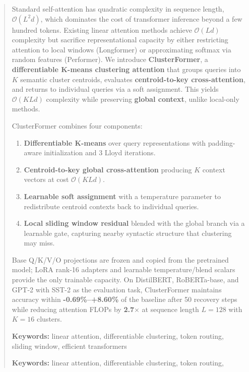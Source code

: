 \documentclass{article}
\begin{document}
\maketitle

\begin{abstract}
Standard self-attention has quadratic complexity in sequence length, 
$\mathcal{O}(L^2 d)$, which dominates the cost of transformer inference 
beyond a few hundred tokens. Existing linear attention methods achieve 
$\mathcal{O}(L d)$ complexity but sacrifice representational capacity by 
either restricting attention to local windows (Longformer) or approximating 
softmax via random features (Performer). We introduce \textbf{ClusterFormer}, a 
\textbf{differentiable K-means clustering attention} that groups queries into 
$K$ semantic cluster centroids, evaluates \textbf{centroid-to-key cross-attention}, 
and returns to individual queries via a soft assignment. This yields 
$\mathcal{O}(K L d)$ complexity while preserving \textbf{global context}, 
unlike local-only methods.

ClusterFormer combines four components:

\begin{enumerate}
\item \textbf{Differentiable K-means} over query representations with padding-aware
  initialization and 3 Lloyd iterations.
\item \textbf{Centroid-to-key global cross-attention} producing $K$ context vectors
  at cost $\mathcal{O}(K L d)$.
\item \textbf{Learnable soft assignment} with a temperature parameter to redistribute
  centroid contexts back to individual queries.
\item \textbf{Local sliding window residual} blended with the global branch via a
  learnable gate, capturing nearby syntactic structure that clustering may
  miss.

\end{enumerate}
Base Q/K/V/O projections are frozen and copied from the pretrained model; 
LoRA rank-16 adapters and learnable temperature/blend scalars provide the 
only trainable capacity. On DistilBERT, RoBERTa-base, and GPT-2 with SST-2 
as the evaluation task, ClusterFormer maintains accuracy within 
\textbf{-0.69\%--+8.60\%} of the baseline after 50 
recovery steps while reducing attention FLOPs by \textbf{2.7$\times$} at 
sequence length $L = 128$ with $K = 16$ clusters.

\textbf{Keywords:} linear attention, differentiable clustering, token routing, 
sliding window, efficient transformers



\vspace{0.5em}
\noindent\textbf{Keywords:} linear attention, differentiable clustering, token routing,
\end{abstract}
\end{document}

